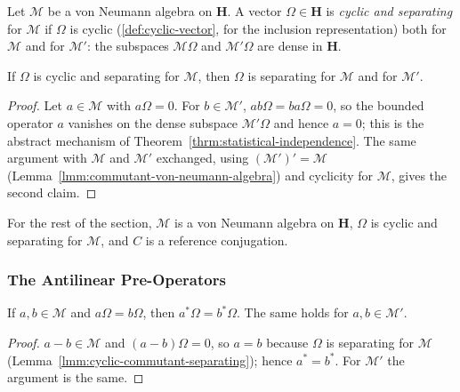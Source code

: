 \begin{definition}
    \label{def:cyclic-separating-vector}
    \leanok
    Let $\mathcal{M}$ be a von Neumann algebra on $\mathbf{H}$. A vector $\Omega \in \mathbf{H}$ is \emph{cyclic and separating} for $\mathcal{M}$ if $\Omega$ is cyclic (\ref{def:cyclic-vector}, for the inclusion representation) both for $\mathcal{M}$ and for $\mathcal{M}'$: the subspaces $\mathcal{M}\Omega$ and $\mathcal{M}'\Omega$ are dense in $\mathbf{H}$.
\end{definition}

\begin{lemma}
    \label{lmm:cyclic-commutant-separating}
    \leanok
    If $\Omega$ is cyclic and separating for $\mathcal{M}$, then $\Omega$ is separating for $\mathcal{M}$ and for $\mathcal{M}'$.
\end{lemma}
\begin{proof}
    \leanok
    Let $a \in \mathcal{M}$ with $a\Omega = 0$. For $b \in \mathcal{M}'$, $a b\Omega = b a\Omega = 0$, so the bounded operator $a$ vanishes on the dense subspace $\mathcal{M}'\Omega$ and hence $a = 0$; this is the abstract mechanism of Theorem~\ref{thrm:statistical-independence}. The same argument with $\mathcal{M}$ and $\mathcal{M}'$ exchanged, using $(\mathcal{M}')' = \mathcal{M}$ (Lemma~\ref{lmm:commutant-von-neumann-algebra}) and cyclicity for $\mathcal{M}$, gives the second claim.
\end{proof}

For the rest of the section, $\mathcal{M}$ is a von Neumann algebra on $\mathbf{H}$, $\Omega$ is cyclic and separating for $\mathcal{M}$, and $C$ is a reference conjugation.

\subsubsection{The Antilinear Pre-Operators}

\begin{lemma}
    \label{lmm:tomita-pre-operators-well-defined}
    \leanok
    If $a, b \in \mathcal{M}$ and $a\Omega = b\Omega$, then $a^*\Omega = b^*\Omega$. The same holds for $a, b \in \mathcal{M}'$.
\end{lemma}
\begin{proof}
    \leanok
    $a - b \in \mathcal{M}$ and $(a - b)\Omega = 0$, so $a = b$ because $\Omega$ is separating for $\mathcal{M}$ (Lemma~\ref{lmm:cyclic-commutant-separating}); hence $a^* = b^*$. For $\mathcal{M}'$ the argument is the same.
\end{proof}

